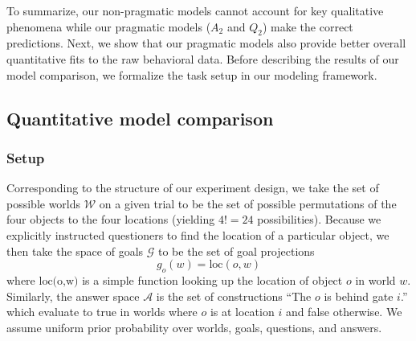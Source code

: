 \documentclass[11pt, floatsintext]{apa6}
\begin{document}


To summarize, our non-pragmatic models cannot account for key qualitative phenomena while our pragmatic models ($A_2$ and $Q_2$) make the correct predictions. 
Next, we show that our pragmatic models also provide better overall quantitative fits to the raw behavioral data. 
Before describing the results of our model comparison, we formalize the task setup in our modeling framework. 

\subsection{Quantitative model comparison}



\subsubsection{Setup} 
Corresponding to the structure of our experiment design, we take the set of possible worlds $\mathcal{W}$ on a given trial to be the set of possible permutations of the four objects to the four locations (yielding $4! = 24$ possibilities). 
Because we explicitly instructed questioners to find the location of a particular object, we then take the space of goals $\mathcal{G}$ to be the set of goal projections $$g_o(w) = \textrm{loc}(o,w)$$ where $\textrm{loc(o,w)}$ is a simple function looking up the location of object $o$ in world $w$. 
Similarly, the answer space $\mathcal{A}$ is the set of constructions ``The $o$ is behind gate $i$.'' which evaluate to true in worlds where $o$ is at location $i$ and false otherwise.
We assume uniform prior probability over worlds, goals, questions, and answers. 
\end{document}
